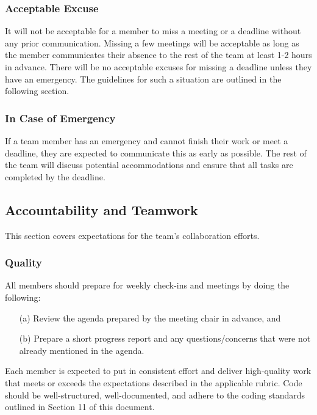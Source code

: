 \documentclass{article}
\begin{document}
\subsubsection*{Acceptable Excuse}

It will not be acceptable for a member to miss a meeting or a deadline without any
prior communication. Missing a few meetings will be acceptable as long as the member
communicates their absence to the rest of the team at least 1-2 hours in advance.
There will be no acceptable excuses for missing a deadline unless they have an 
emergency. The guidelines for such a situation are outlined in the following section.

\subsubsection*{In Case of Emergency}

If a team member has an emergency and cannot finish their work or meet a deadline,
they are expected to communicate this as early as possible. The rest of the team will
discuss potential accommodations and ensure that all tasks are completed by the
deadline.

\subsection*{Accountability and Teamwork}

This section covers expectations for the team's collaboration efforts.

\subsubsection*{Quality} 

All members should prepare for weekly check-ins and meetings by doing the following:

\begin{itemize}
  \item[(a)] Review the agenda prepared by the meeting chair in advance, and
  \item[(b)] Prepare a short progress report and any questions/concerns that were not
  already mentioned in the agenda.
\end{itemize}

\noindent Each member is expected to put in consistent effort and deliver high-quality work
that meets or exceeds the expectations described in the applicable rubric. Code
should be well-structured, well-documented, and adhere to the coding standards
outlined in Section 11 of this document.
\end{document}
